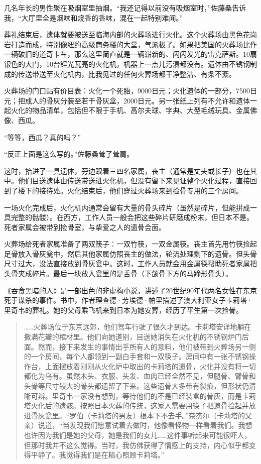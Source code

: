 \documentclass[12pt,oneside]{book}
\begin{document}
\begin{bookref}[frametitle={\cite{好好告别}}]
几名年长的男性聚在吸烟室里抽烟。“我还记得以前没有吸烟室时，”佐藤桑告诉我，“大厅里全是烟味和烧香的香味，混在一起特别难闻。”

葬礼结束后，遗体就要被送至临海内部的火葬场进行火化。这个火葬场由黑色花岗岩打造而成，特别像纽约高级商务楼的大堂，气派极了。如果把美国的火葬场比作一辆破旧的道奇卡车，那么这里简直就是一辆崭新的、闪闪发光的雷克萨斯。10扇银色的大门，10台锃光瓦亮的火化机，机器上一点儿污渍都没有。遗体由不锈钢制成的传送带送至火化机内，比我见过的任何火葬场都干净整洁、有条不紊。

火葬场的门口贴有价目表：火化一个死胎，9000日元；火化遗体的一部分，7500日元；把成人的骨灰分装至若干骨灰盒，2000日元。另一张纸上列有不允许和遗体一起火化的物品清单，包括但不限于手机、高尔夫球、字典、大型毛绒玩具、金属佛像、西瓜。

“等等，西瓜？真的吗？”

“反正上面是这么写的。”佐藤桑耸了耸肩。

这时，抬进了一具遗体，旁边跟着三四名家属，丧主（通常是丈夫或长子）也在其中。他们目送遗体由传送带送进火化机，但没有留下来见证整个火化过程，直接回到了楼下的接待处。火化结束后，他们穿过火葬场来到捡骨专用的三个房间。

一场火化完成后，火化机内通常会留有大量的骨头碎片（虽然是碎片，但能拼成一具完整的骷髅）。在西方，工作人员一般会把这些碎片研磨成粉末，但日本不是。死者家属会被带到捡骨室，与挚爱之人的遗骨会面。

火葬场给死者家属准备了两双筷子：一双竹筷，一双金属筷。丧主首先用竹筷捡起足骨放入骨灰瓮中，然后其他家属仿照丧主的做法，轮流处理剩下的遗骨。但头骨尺寸过大，没法直接放到骨灰瓮中。这时，工作人员就会用金属筷帮助死者家属把头骨夹成碎片。最后一块放入瓮里的是舌骨（下颌骨下方的马蹄形骨头）。

《吞食黑暗的人》是一部出色的非虚构小说，讲述了20世纪90年代两名女性在东京死于谋杀的事件。书中，作者理查德·劳埃德·帕里描述了澳大利亚女子卡莉塔·里奇韦的葬礼。她的父母乘飞机来到日本为她安葬，经历了平生第一次捡骨。

\begin{quotation}
……火葬场位于东京远郊，他们驾车行驶了很久才到达。卡莉塔安详地躺在撒满花瓣的棺材里。他们向她道别，目送她消失在火化机的不锈钢炉门后面。然而，接下来发生的事情出乎所有人的意料，他们被带到火葬场另一侧的一个房间，每个人都领到一副白手套和一双筷子。房间中有一张不锈钢操作台，上面摆放着刚刚从火化炉中取出的卡莉塔的遗骨，火化并没有将一切都化为乌有。虽然木头、衣服、头发、血肉已经全然不见，但腿骨、臂骨和头骨等尺寸较大的骨头都遗留了下来。这些遗骨大多带有裂痕，但形状仍清晰可辨。里奇韦一家没有想到，等待他们的不是已经装盒的骨灰，而是卡莉塔火化后的遗骸。按照日本火葬的传统，这家人需要用筷子把遗骨捡起并放进骨灰瓮里。“罗伯（卡莉塔的男友）根本下不去手。”奈杰尔（卡莉塔的父亲）说道，“当发现我们愿意试着去做时，他像看怪物一样看着我们。我想也许因为我们是她的父母，她是我们的女儿……这件事听起来可能很吓人，但那时我并不这么觉得。当时，我仿佛获得了情感上的支持，内心似乎都变得平静了。我觉得我们是在精心照顾卡莉塔。”
\end{quotation}


\end{bookref}
\end{document}
